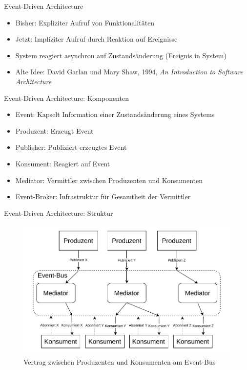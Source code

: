 \begin{frame}{Event-Driven Architecture}
    \begin{itemize}
        \item Bisher: Expliziter Aufruf von Funktionalitäten
        \item Jetzt: Impliziter Aufruf durch Reaktion auf Ereignisse \cite{garlanShawImplizit}
        \item System reagiert asynchron auf Zustandsänderung (Ereignis in System)
        \item Alte Idee: David Garlan und Mary Shaw, 1994, \textit{An Introduction to Software Architecture}
    \end{itemize}
\end{frame}

\begin{frame}{Event-Driven Architecture: Komponenten}
    \begin{itemize}
        \item Event: Kapselt Information einer Zustandsänderung eines Systems \cite{eda}
        \item Produzent: Erzeugt Event
        \item Publisher: Publiziert erzeugtes Event
        \item Konsument: Reagiert auf Event
        \item Mediator: Vermittler zwischen Produzenten und Konsumenten
        \item Event-Broker: Infrastruktur für Gesamtheit der Vermittler
    \end{itemize}
\end{frame}

\begin{frame}{Event-Driven Architecture: Struktur}
    \begin{figure}[!h]
        \centering
        \includegraphics[scale=0.55]{imglib/eda/eda.drawio}
        \caption{Vertrag zwischen Produzenten und Konsumenten am Event-Bus}
        \label{fig:eda}
    \end{figure}
\end{frame}

